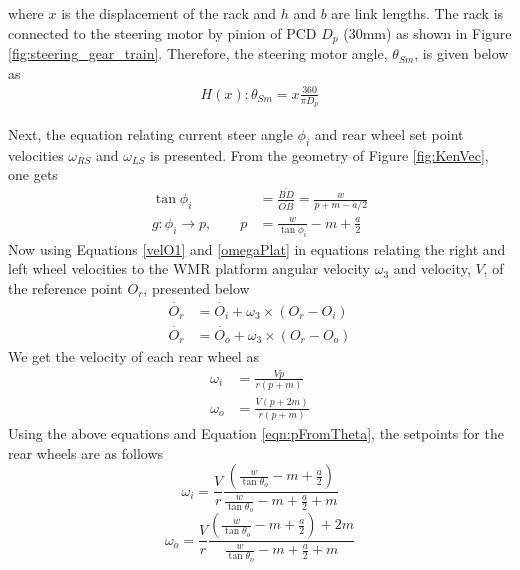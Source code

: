 where $x$ is the displacement of the rack and $h$ and $b$ are link lengths. The rack is connected to the steering motor by pinion of PCD $D_p$ (30mm) as shown in  Figure \ref{fig:steering_gear_train}. Therefore, the steering motor angle,  $ \theta_{Sm}$, is given below as
\begin{eqnarray}
H(x): \theta_{Sm}= x \frac{360}{\pi D_p}
\label{eqn:sterineq2}
\end{eqnarray}
 
Next,  the equation relating current steer angle $\phi_{i}$   and rear wheel  set point velocities $\omega_{RS}$ and $\omega_{LS}$ is presented. From the geometry of Figure \ref{fig:KenVec}, one gets
\begin{align}
\nonumber \tan\phi_{i} &=\frac{\bar{BD}}{\bar{OB}}=\frac{w}{p+m-a/2}\\ 
g:\phi_{i} \rightarrow p,\quad \quad p &= \frac{w}{\tan\phi_{i}}-m + \frac{a}{2}
\label{eqn:pFromTheta}
\end{align}
Now using Equations \ref{velO1} and \ref{omegaPlat}  in equations relating the right and left wheel velocities to the WMR platform angular velocity $\omega_3$ and velocity, $V$, of the reference point $O_r$, presented below
\begin{align*}
\dot{O_r}&=\dot{O_i}+\omega_3 \times (O_r-O_i)\\
\dot{O_r}&=\dot{O_o}+\omega_3 \times (O_r-O_o)
\end{align*}
 We get the  velocity of each rear wheel as  
\begin{align}
\nonumber \omega_i&=\frac{Vp}{r(p+m)}\\
\nonumber \omega_o &=\frac{V(p+2m)}{r(p+m)}
\end{align}
Using the above equations and Equation \ref{eqn:pFromTheta},  the setpoints for the rear wheels are as follows 
\begin{equation}
\omega_i =\frac{V}{r}\frac{( \frac{w}{\tan\theta_o}-m + \frac{a}{2})}{ \frac{w}{\tan\theta_o}-m + \frac{a}{2}+m}
\end{equation}
\begin{equation}
\omega_o =\frac{V}{r}\frac{( \frac{w}{\tan\theta_o}-m + \frac{a}{2})+2m}{ \frac{w}{\tan\theta_o}-m + \frac{a}{2}+m}
\end{equation}
 

